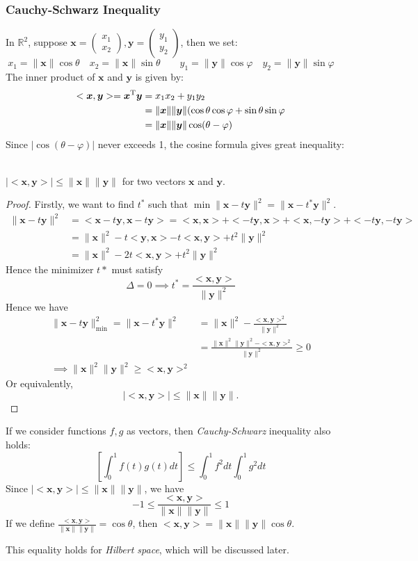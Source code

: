 \subsubsection{Cauchy-Schwarz Inequality}
In $\mathbb{R}^2$, suppose $\bm x=\begin{pmatrix}
x_1\\x_2
\end{pmatrix},\bm y=\begin{pmatrix}
y_1\\y_2
\end{pmatrix}$, then we set:
\[
x_1=\|\bm x\|\cos\theta\quad x_2=\|\bm x\|\sin\theta\qquad
y_1=\|\bm y\|\cos\varphi\quad y_2=\|\bm y\|\sin\varphi\qquad
\]
The inner product of $\bm x$ and $\bm y$ is given by:
\[
\begin{aligned}
<\bm x,\bm y>=\bm x^{\mathrm T}\bm y&=x_1x_2+y_1y_2\\
											 &=\|\bm x\|\|\bm y\|(\cos\theta\cos\varphi+\sin\theta\sin\varphi\\
											 &=\|\bm x\|\|\bm y\|\cos(\theta-\varphi)
\end{aligned}
\]
Since $|\cos(\theta-\varphi)|$ never exceeds 1, the cosine formula gives great inequality:
\begin{theorem}\qquad\\
$|<\bm x,\bm y>|\le\|\bm x\|\|\bm y\|$ for two vectors $\bm x$ and $\bm y$.
\end{theorem}
\begin{proof}
Firstly, we want to find $t^{*}$ such that $\min\|\bm x-t\bm y\|^2=\|\bm x-t^{*}\bm y\|^2$.\\
\[\begin{aligned}
\|\bm x-t\bm y\|^2&=<\bm x-t\bm y,\bm x-t\bm y>=<\bm x,\bm x>+<-t\bm y,\bm x>+<\bm x,-t\bm y>+<-t\bm y,-t\bm y>\\
&=\|\bm x\|^2-t<\bm y,\bm x>-t<\bm x,\bm y>+t^2\|\bm y\|^2\\
&=\|\bm x\|^2-2t<\bm x,\bm y>+t^2\|\bm y\|^2
\end{aligned}
\]
Hence the minimizer $t*$ must satisfy
\[
\Delta=0\implies
t^{*}=\frac{<\bm x,\bm y>}{\|\bm y\|^2}
\]
Hence we have 
\[\begin{aligned}
\|\bm x-t\bm y\|^2_{\min}=\|\bm x-t^*\bm y\|^2&=
\|\bm x\|^2-\frac{<\bm x,\bm y>^2}{\|\bm y\|^2}\\
&=\frac{\|\bm x\|^2\|\bm y\|^2-<\bm x,\bm y>^2}{\|\bm y\|^2}\ge 0\\
\implies
\|\bm x\|^2\|\bm y\|^2\ge<\bm x,\bm y>^2
\end{aligned}
\]
Or equivalently,
\[
|<\bm x,\bm y>|\le\|\bm x\|\|\bm y\|.
\]
\end{proof}
If we consider functions $f,g$ as vectors, then \emph{Cauchy-Schwarz} inequality also holds:
\[
\left[
\int_0^1f(t)g(t)dt
\right]\le
\int_0^1f^2dt\int_0^1g^2dt
\]
Since $|<\bm x,\bm y>|\le\|\bm x\|\|\bm y\|$, we have
\[
-1\le\frac{<\bm x,\bm y>}{\|\bm x\|\|\bm y\|}\le 1
\]
If we define $\frac{<\bm x,\bm y>}{\|\bm x\|\|\bm y\|}=\cos\theta$, then $<\bm x,\bm y>=\|\bm x\|\|\bm y\|\cos\theta$.
\begin{remark}
This equality holds for \emph{Hilbert space}, which will be discussed later.
\end{remark}
